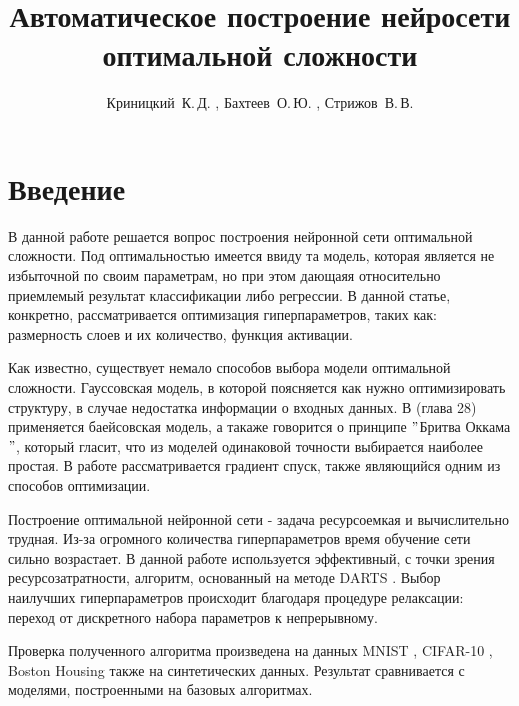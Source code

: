 \documentclass[12pt, twoside]{article}
\title
    {Автоматическое построение нейросети оптимальной сложности }
\author
    {Криницкий~К.\,Д. , Бахтеев~О.\,Ю. , Стрижов~В.\,В.}
\begin{document}
\maketitle

\section{Введение}
  В данной работе решается вопрос построения нейронной сети оптимальной сложности. Под оптимальностью имеется ввиду та модель, которая является не избыточной по своим параметрам, но при этом дающаяя относительно приемлемый результат классификации либо регрессии. В данной статье, конкретно, рассматривается оптимизация гиперпараметров, таких как: размерность слоев и их количество, функция активации.
  \par Как известно, существует немало способов выбора модели оптимальной сложности. Гауссовская модель\cite{GaussianModel}, в которой поясняется как нужно оптимизировать структуру, в случае недостатка информации о входных данных. В \cite{BayesianModel}(глава 28) применяется баейсовская модель, а такаже говорится о принципе $"$Бритва Оккама$"$, который гласит, что из моделей одинаковой точности выбирается наиболее простая. В работе \cite{GradientDescent} рассматривается градиент спуск, также являющийся одним из способов оптимизации. 
  \par Построение оптимальной нейронной сети - задача ресурсоемкая и вычислительно трудная. Из-за огромного количества гиперпараметров время обучение сети сильно возрастает. В данной работе используется эффективный, с точки зрения ресурсозатратности, алгоритм, основанный на методе DARTS \cite{DARTS}. Выбор наилучших гиперпараметров происходит благодаря процедуре релаксации: переход от дискретного набора параметров к непрерывному.
  \par Проверка полученного алгоритма произведена на данных MNIST \cite{MNIST}, CIFAR-10 \cite{CIFAR}, Boston Housing \cite{Boston} также на синтетических данных. Результат сравнивается с моделями, построенными на базовых алгоритмах.
\end{document}

